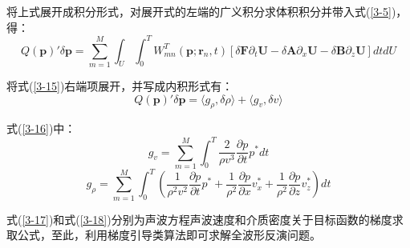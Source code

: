 \documentclass[12pt]{article}
\begin{document}
\par
将上式展开成积分形式，对展开式的左端的广义积分求体积积分并带入式(\ref{3-5})，得：
\begin{equation}\label{3-15}
Q(\boldsymbol{p})' \delta\boldsymbol{p}=\sum_{m=1}^{M} \int_U \int_{0}^{T} W^T_{mn}(\boldsymbol{p};\boldsymbol{r}_n,t)
[\delta\boldsymbol{F}\partial_t \boldsymbol{U}-\delta\boldsymbol{A}\partial_x \boldsymbol{U}-\delta\boldsymbol{B}\partial_z \boldsymbol{U}]dtdU
\end{equation}
\par
将式(\ref{3-15})右端项展开，并写成内积形式有：
\begin{equation}\label{3-16}
Q(\boldsymbol{p})' \delta\boldsymbol{p}=\langle g_{\rho},\delta\rho\rangle+\langle g_v,\delta v\rangle
\end{equation}
\par
式(\ref{3-16})中：
\begin{equation}\label{3-17}
g_{v}=\sum_{m=1}^M \int_0^T \frac{2}{\rho v^3}\frac{\partial p}{\partial t}p^*dt
\end{equation}
\begin{equation}\label{3-18}
g_{\rho}=\sum_{m=1}^M \int_0^T (\frac{1}{\rho^2 v^2}\frac{\partial p}{\partial t}p^*+\frac{1}{\rho^2}\frac{\partial p}{\partial x}v_x^*+\frac{1}{\rho^2}\frac{\partial p}{\partial z}v_z^*)dt
\end{equation}
\par
式(\ref{3-17})和式(\ref{3-18})分别为声波方程声波速度和介质密度关于目标函数的梯度求取公式，至此，利用梯度引导类算法即可求解全波形反演问题。
\end{document}
